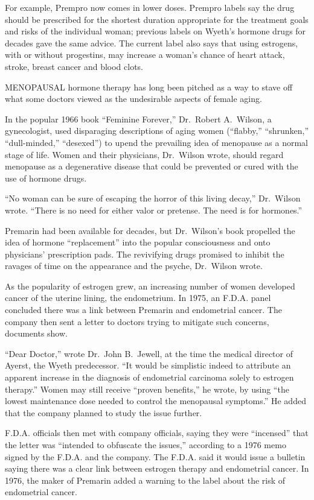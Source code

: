 ﻿\documentclass[12pt]{article}
\begin{document}
For example, Prempro now comes in lower doses. Prempro labels say the drug should be prescribed for
the shortest duration appropriate for the treatment goals and risks of the individual woman;
previous labels on Wyeth's hormone drugs for decades gave the same advice. The current label also
says that using estrogens, with or without progestins, may increase a woman's chance of heart
attack, stroke, breast cancer and blood clots.

MENOPAUSAL hormone therapy has long been pitched as a way to stave off what some doctors viewed as
the undesirable aspects of female aging.

In the popular 1966 book ``Feminine Forever,'' Dr.~Robert A.~Wilson, a gynecologist, used
disparaging descriptions of aging women (``flabby,'' ``shrunken,'' ``dull-minded,'' ``desexed'') to
upend the prevailing idea of menopause as a normal stage of life. Women and their physicians,
Dr.~Wilson wrote, should regard menopause as a degenerative disease that could be prevented or cured
with the use of hormone drugs.

``No woman can be sure of escaping the horror of this living decay,'' Dr.~Wilson wrote. ``There is
no need for either valor or pretense. The need is for hormones.''

Premarin had been available for decades, but Dr.~Wilson's book propelled the idea of hormone
``replacement'' into the popular consciousness and onto physicians' prescription pads. The
revivifying drugs promised to inhibit the ravages of time on the appearance and the psyche,
Dr.~Wilson wrote.

As the popularity of estrogen grew, an increasing number of women developed cancer of the uterine
lining, the endometrium. In 1975, an F.D.A. panel concluded there was a link between Premarin and
endometrial cancer. The company then sent a letter to doctors trying to mitigate such concerns,
documents show.

``Dear Doctor,'' wrote Dr.~John B.~Jewell, at the time the medical director of Ayerst, the Wyeth
predecessor. ``It would be simplistic indeed to attribute an apparent increase in the diagnosis of
endometrial carcinoma solely to estrogen therapy.'' Women may still receive ``proven benefits,'' he
wrote, by using ``the lowest maintenance dose needed to control the menopausal symptoms.'' He added
that the company planned to study the issue further.

F.D.A. officials then met with company officials, saying they were ``incensed'' that the letter was
``intended to obfuscate the issues,'' according to a 1976 memo signed by the F.D.A. and the company.
The F.D.A. said it would issue a bulletin saying there was a clear link between estrogen therapy and
endometrial cancer. In 1976, the maker of Premarin added a warning to the label about the risk of
endometrial cancer.
\end{document}
